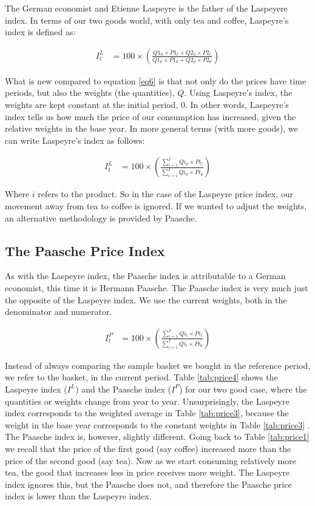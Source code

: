 \documentclass[]{book}
\begin{document}
The German economist and Etienne Laspeyre is the father of the Laspeyere index. In terms of our two goods world, with only tea and coffee, Laspeyre's index is defined as:

\begin{align}
I_t^L&=100\times \left(\frac{Q1_0 \times P1_t+Q2_0 \times P2_t}{Q1_0 \times P1_0+Q2_0 \times P2_0}\right)
    \label{eq8}
\end{align}

What is new compared to equation \eqref{eq6} is that not only do the prices have time periods, but also the weights (the quantities), \(Q\). Using Laspeyre's index, the weights are kept constant at the initial period, 0. In other words, Laspeyre's index tells us how much the price of our consumption has increased, given the relative weights in the base year. In more general terms (with more goods), we can write Laspeyre's index as follows:

\begin{align}
   I_t^L&=100\times \left(\frac{\sum^I_{i=1} Qi_0 \times Pi_t}{\sum^I_{i=1}Qi_0 \times Pi_0}\right)
    \label{eq9}
\end{align}

Where \(i\) refers to the product. So in the case of the Laspeyre price index, our movement away from tea to coffee is ignored. If we wanted to adjust the weights, an alternative methodology is provided by Paasche.

\hypertarget{the-paasche-price-index}{%
\subsection{The Paasche Price Index}\label{the-paasche-price-index}}

As with the Laspeyre index, the Paasche index is attributable to a German economist, this time it is Hermann Paasche. The Paasche index is very much just the opposite of the Laspeyre index. We use the current weights, both in the denominator and numerator.

\begin{align}
   I_t^P&=100\times \left(\frac{\sum^I_{i=1} Qi_t \times Pi_t}{\sum^I_{i=1}Qi_t \times Pi_0}\right)
    \label{eq10}
\end{align}

Instead of always comparing the sample basket we bought in the reference period, we refer to the basket, in the current period. Table \ref{tab:price4} shows the Laspeyre index (\(I^L\)) and the Paasche index (\(I^P\)) for our two good case, where the quantities or weights change from year to year. Unsurprisingly, the Laspeyre index corresponds to the weighted average in Table \ref{tab:price3}, because the weight in the base year corresponds to the constant weights in Table \ref{tab:price3} . The Paasche index is, however, slightly different. Going back to Table \ref{tab:price1} we recall that the price of the first good (say coffee) increased more than the price of the second good (say tea). Now as we start consuming relatively more tea, the good that increases less in price receives more weight. The Laspeyre index ignores this, but the Paasche does not, and therefore the Paasche price index is lower than the Laspeyre index.
\end{document}
